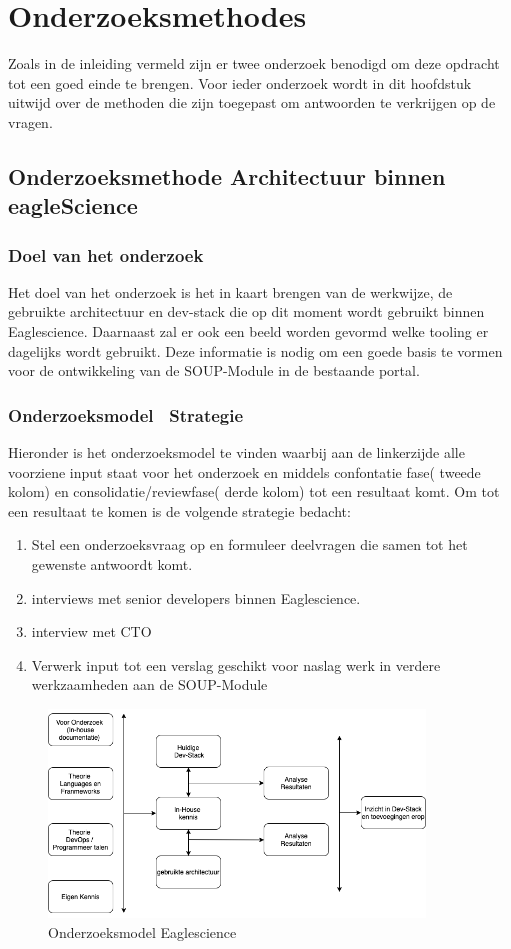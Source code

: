 
\chapter{Onderzoeksmethodes} %

\label{OnderzoeksMethode} %
Zoals in de inleiding vermeld zijn er twee onderzoek benodigd om deze opdracht tot een goed einde te brengen. Voor ieder onderzoek wordt in dit hoofdstuk uitwijd over de methoden die zijn toegepast om antwoorden te verkrijgen op de vragen.
\section{Onderzoeksmethode Architectuur binnen eagleScience}
\subsection{Doel van het onderzoek}
Het doel van het onderzoek is het in kaart brengen van de werkwijze, de gebruikte architectuur en dev-stack die op dit moment wordt gebruikt binnen Eaglescience. Daarnaast zal er ook een beeld worden gevormd welke tooling er dagelijks wordt gebruikt. Deze informatie is nodig om een goede basis te vormen voor de ontwikkeling van de SOUP-Module in de bestaande portal.

\subsection{Onderzoeksmodel \ Strategie}
Hieronder is het onderzoeksmodel te vinden waarbij aan de linkerzijde alle voorziene input staat voor het onderzoek en middels confontatie fase( tweede kolom) en consolidatie/reviewfase( derde kolom) tot een resultaat komt. Om tot een resultaat te komen is de volgende strategie bedacht:
\begin{enumerate}
  \item Stel een onderzoeksvraag op en formuleer deelvragen die samen tot het gewenste antwoordt komt.
  \item interviews met senior developers binnen Eaglescience.
  \item interview met CTO
  \item Verwerk input tot een verslag geschikt voor naslag werk in verdere werkzaamheden aan de SOUP-Module
\end{enumerate}
\begin{figure}[h!]
\myfloatalign
\includegraphics[width=10cm]{gfx/OnderzoeksmodelES}
\caption{Onderzoeksmodel Eaglescience}
\label{fig:Onderzoeks model Dev-Stack}
\end{figure}



